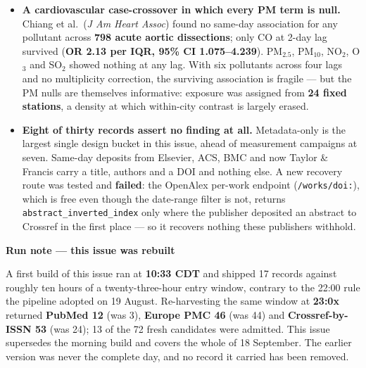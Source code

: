 \documentclass[10pt]{article}
\begin{document}
\begin{itemize}
\textbf{ALWC 76.5\,$\mu$g/m$^3$}. That is the same humidity band in which optical low-cost
sensors diverge from reference monitors --- the aerosol is physically changing where the
instrument is least trustworthy. One site, one winter, no out-of-sample validation.
\item \textbf{A cardiovascular case-crossover in which every PM term is null.}
Chiang et al.\ (\textit{J Am Heart Assoc}) found no same-day association for any pollutant
across \textbf{798 acute aortic dissections}; only CO at 2-day lag survived
(\textbf{OR 2.13 per IQR, 95\% CI 1.075--4.239}). PM$_{2.5}$, PM$_{10}$, NO$_2$, O$_3$ and
SO$_2$ showed nothing at any lag. With six pollutants across four lags and no multiplicity
correction, the surviving association is fragile --- but the PM nulls are themselves
informative: exposure was assigned from \textbf{24 fixed stations}, a density at which
within-city contrast is largely erased.
\item \textbf{Eight of thirty records assert no finding at all.} Metadata-only is the
largest single design bucket in this issue, ahead of measurement campaigns at seven.
Same-day deposits from Elsevier, ACS, BMC and now Taylor \& Francis carry a title, authors
and a DOI and nothing else. A new recovery route was tested and \textbf{failed}: the
OpenAlex per-work endpoint (\texttt{/works/doi:}), which is free even though the
date-range filter is not, returns \texttt{abstract\_inverted\_index} only where the
publisher deposited an abstract to Crossref in the first place --- so it recovers nothing
these publishers withhold.
\end{itemize}

\begin{keybox}
{\sffamily\bfseries\footnotesize\color{Deep}Run note --- this issue was rebuilt}\\[1.2mm]
{\fontsize{7.2}{8.8}\selectfont
A first build of this issue ran at \textbf{10:33 CDT} and shipped 17 records against
roughly ten hours of a twenty-three-hour entry window, contrary to the 22:00 rule the
pipeline adopted on 19 August. Re-harvesting the same window at \textbf{23:0x} returned
\textbf{PubMed 12} (was 3), \textbf{Europe PMC 46} (was 44) and \textbf{Crossref-by-ISSN 53}
(was 24); 13 of the 72 fresh candidates were admitted. This issue supersedes the morning
build and covers the whole of 18 September. The earlier version was never the complete
day, and no record it carried has been removed.\par}
\end{keybox}
\end{document}
